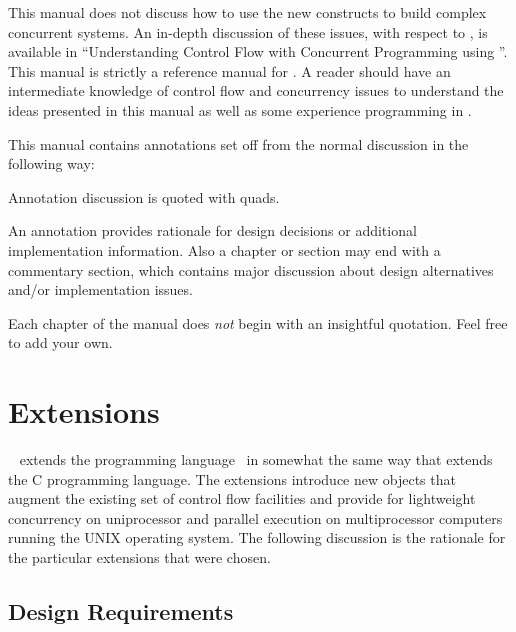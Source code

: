 \documentclass[openright,twoside]{report}
\begin{document}
This manual does not discuss how to use the new constructs to build complex concurrent systems.
An in-depth discussion of these issues, with respect to \uC, is available in ``Understanding Control Flow with Concurrent Programming using \uC''.
This manual is strictly a reference manual for \uC.
A reader should have an intermediate knowledge of control flow and concurrency issues to understand the ideas presented in this manual as well as some experience programming in \CC.

This manual contains annotations set off from the normal discussion in the following way:
\begin{annotation}
Annotation discussion is quoted with quads.
\end{annotation}
An annotation provides rationale for design decisions or additional implementation information.
Also a chapter or section may end with a commentary section, which contains major discussion about design alternatives and/or implementation issues.

Each chapter of the manual does \emph{not} begin with an insightful quotation.
Feel free to add your own.


\chapter{\texorpdfstring{\uC Extensions}{uC++ Extensions}}

\uC~\cite{Buhr92c} extends the \CC programming language~\cite{C++:V3} in somewhat the same way that \CC extends the C programming language.
The extensions introduce new objects that augment the existing set of control flow facilities and provide for lightweight concurrency on uniprocessor and parallel execution on multiprocessor computers running the UNIX operating system.
The following discussion is the rationale for the particular extensions that were chosen.


\section{Design Requirements}
\end{document}
